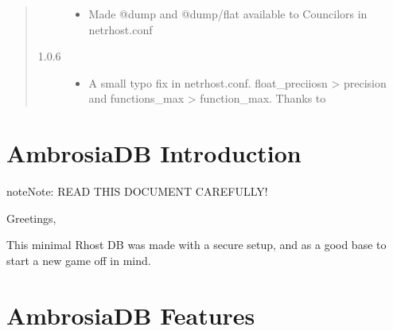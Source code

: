 \documentclass[letterpaper,10pt,english]{sphinxmanual}
\begin{document}
\begin{quote}
\begin{description}
\begin{itemize}
\item {} 
\sphinxAtStartPar
Made @dump and @dump/flat available to Councilors in netrhost.conf

\end{itemize}

\item[{1.0.6}] \leavevmode\begin{itemize}
\item {} 
\sphinxAtStartPar
A small typo fix in netrhost.conf. float\_preciiosn \sphinxhyphen{}\textgreater{} precision and
functions\_max \sphinxhyphen{}\textgreater{} function\_max. Thanks to 

\end{itemize}

\end{description}
\end{quote}


\section{AmbrosiaDB Introduction}
\label{\detokenize{ambrosiadb:ambrosiadb-introduction}}
\begin{sphinxadmonition}{note}{Note:}
\sphinxAtStartPar
READ THIS DOCUMENT CAREFULLY!
\end{sphinxadmonition}

\sphinxAtStartPar
Greetings,

\sphinxAtStartPar
This minimal Rhost DB was made with a secure setup, and as a good base to start
a new game off in mind.


\section{AmbrosiaDB Features}
\label{\detokenize{ambrosiadb:ambrosiadb-features}}
\end{document}
